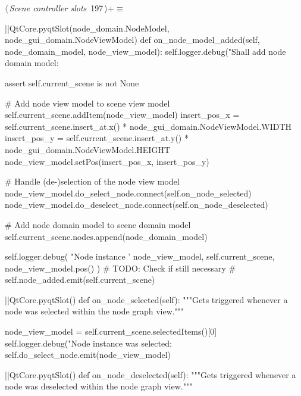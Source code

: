 \documentclass[%
    a4paper,    %
    justified,  %
    nobib,      %
    openany     %
]{tufte-book}
\makeatletter
\renewcommand{\label}[1]{\@tufte@label{##1}}%
\makeatother
\begin{document}
\begin{fullwidth}
\begin{flushleft}
\begin{minipage}{\linewidth}
\begin{list}{}{\setlength{\itemsep}{-\parsep}\setlength{\itemindent}{-\leftmargin}}
\item{}
\end{list}
\end{minipage}\vspace{4ex}
\end{flushleft}
\begin{flushleft} \small
\begin{minipage}{\linewidth}\label{scrap188}\raggedright\small
{} $\langle\,${\itshape Scene controller slots}\nobreak\ {\footnotesize {197}}$\,\rangle+\equiv$
\vspace{-1ex}
\begin{pythoncode}
|\normalfont{}\fontfamily{}|QtCore.pyqtSlot(node_domain.NodeModel, node_gui_domain.NodeViewModel)
def on_node_model_added(self, node_domain_model, node_view_model):
    self.logger.debug("Shall add node domain model: %

    assert self.current_scene is not None

    # Add node view model to scene view model
    self.current_scene.addItem(node_view_model)
    insert_pos_x = self.current_scene.insert_at.x() * node_gui_domain.NodeViewModel.WIDTH
    insert_pos_y = self.current_scene.insert_at.y() * node_gui_domain.NodeViewModel.HEIGHT
    node_view_model.setPos(insert_pos_x, insert_pos_y)

    # Handle (de-)selection of the node view model
    node_view_model.do_select_node.connect(self.on_node_selected)
    node_view_model.do_deselect_node.connect(self.on_node_deselected)

    # Add node domain model to scene domain model
    self.current_scene.nodes.append(node_domain_model)

    self.logger.debug(
        "Node instance '%
        node_view_model,
        self.current_scene,
        node_view_model.pos()
    )
    # TODO: Check if still necessary
    # self.node_added.emit(self.current_scene)

|\normalfont{}\fontfamily{}|QtCore.pyqtSlot()
def on_node_selected(self):
    """Gets triggered whenever a node was selected within the node graph
    view."""

    node_view_model = self.current_scene.selectedItems()[0]
    self.logger.debug("Node instance was selected: %
    self.do_select_node.emit(node_view_model)

|\normalfont{}\fontfamily{}|QtCore.pyqtSlot()
def on_node_deselected(self):
    """Gets triggered whenever a node was deselected within the node graph
    view."""


\end{pythoncode}
\end{minipage}
\end{flushleft}
\end{fullwidth}
\end{document}
